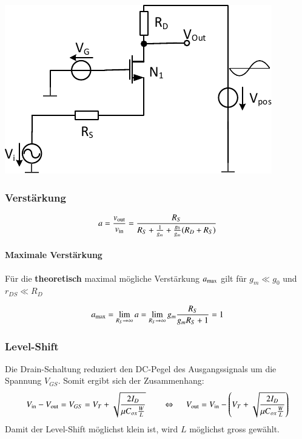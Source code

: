\begin{minipage}[t]{0.4\columnwidth}
    \includegraphics[width=\columnwidth, align=t]{images/03_drain_schaltung.pdf}
\end{minipage}
\hfill
\begin{minipage}[t]{0.58\columnwidth}
    \subsubsection{Verstärkung}

    \vspace{-0.2cm}
    \[
        a = \frac{v_{\rm out}}{v_{\rm in}} = \frac{R_S}{R_S + \frac{1}{g_m} + \frac{g_0}{g_m} (R_D + R_S)}
    \]

    \paragraph{Maximale Verstärkung}

    Für die \textbf{theoretisch} maximal mögliche Verstärkung $a_{\rm max}$ gilt für
    $g_m \ll g_0$ und $r_{DS} \ll R_D$

    \vspace{-0.2cm}

    \[
        a_{\rm max} = \lim_{R_S \to \infty} a = \lim_{R_S \to \infty} g_m \frac{R_S}{g_m R_S + 1} = 1
    \]
\end{minipage}


\subsubsection{Level-Shift}
Die Drain-Schaltung reduziert den DC-Pegel des Ausgangssignals um die Spannung $V_{GS}$. Somit ergibt sich der Zusammenhang:
\[
    V_{\rm in} - V_{\rm out} =  V_{GS} = V_T + \sqrt{\frac{2 I_D}{\mu C_{ox} \frac{W}{L}}} \qquad \Leftrightarrow\ \quad  V_{\rm out} = V_{\rm in} - \left( V_T + \sqrt{\frac{2 I_D}{\mu C_{ox} \frac{W}{L}}} \right)
\]
Damit der Level-Shift möglichst klein ist, wird $L$ möglichst gross gewählt.


